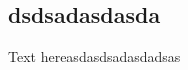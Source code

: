 \documentclass[main.tex]{subfiles} %
\begin{document}

\subsection{dsdsadasdasda}

Text hereasdasdsadasdadsas 
\end{document}
